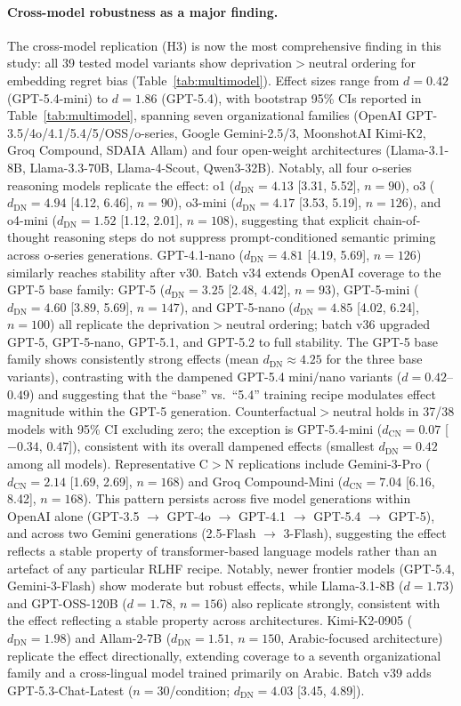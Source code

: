\documentclass[conference,10pt]{IEEEtran}
\begin{document}
\paragraph{Cross-model robustness as a major finding.}
The cross-model replication (H3) is now the most comprehensive finding in this study: all 39 tested model variants show deprivation$>$neutral ordering for embedding regret bias (Table~\ref{tab:multimodel}). Effect sizes range from $d=0.42$ (GPT-5.4-mini) to $d=1.86$ (GPT-5.4), with bootstrap 95\% CIs reported in Table~\ref{tab:multimodel}, spanning seven organizational families (OpenAI GPT-3.5/4o/4.1/5.4/5/OSS/o-series, Google Gemini-2.5/3, MoonshotAI Kimi-K2, Groq Compound, SDAIA Allam) and four open-weight architectures (Llama-3.1-8B, Llama-3.3-70B, Llama-4-Scout, Qwen3-32B). Notably, all four o-series reasoning models replicate the effect: o1 ($d_\text{DN}=4.13$ [3.31, 5.52], $n=90$), o3 ($d_\text{DN}=4.94$ [4.12, 6.46], $n=90$), o3-mini ($d_\text{DN}=4.17$ [3.53, 5.19], $n=126$), and o4-mini ($d_\text{DN}=1.52$ [1.12, 2.01], $n=108$), suggesting that explicit chain-of-thought reasoning steps do not suppress prompt-conditioned semantic priming across o-series generations. GPT-4.1-nano ($d_\text{DN}=4.81$ [4.19, 5.69], $n=126$) similarly reaches stability after v30. Batch v34 extends OpenAI coverage to the GPT-5 base family: GPT-5 ($d_\text{DN}=3.25$ [2.48, 4.42], $n=93$), GPT-5-mini ($d_\text{DN}=4.60$ [3.89, 5.69], $n=147$), and GPT-5-nano ($d_\text{DN}=4.85$ [4.02, 6.24], $n=100$) all replicate the deprivation$>$neutral ordering; batch v36 upgraded GPT-5, GPT-5-nano, GPT-5.1, and GPT-5.2 to full stability. The GPT-5 base family shows consistently strong effects (mean $d_\text{DN}\approx4.25$ for the three base variants), contrasting with the dampened GPT-5.4 mini/nano variants ($d=0.42$--$0.49$) and suggesting that the ``base'' vs.\ ``5.4'' training recipe modulates effect magnitude within the GPT-5 generation. Counterfactual$>$neutral holds in 37/38 models with 95\% CI excluding zero; the exception is GPT-5.4-mini ($d_\text{CN}=0.07$ [$-0.34$, $0.47$]), consistent with its overall dampened effects (smallest $d_\text{DN}=0.42$ among all models). Representative C$>$N replications include Gemini-3-Pro ($d_\text{CN}=2.14$ [1.69, 2.69], $n=168$) and Groq Compound-Mini ($d_\text{CN}=7.04$ [6.16, 8.42], $n=168$). This pattern persists across five model generations within OpenAI alone (GPT-3.5 $\to$ GPT-4o $\to$ GPT-4.1 $\to$ GPT-5.4 $\to$ GPT-5), and across two Gemini generations (2.5-Flash $\to$ 3-Flash), suggesting the effect reflects a stable property of transformer-based language models rather than an artefact of any particular RLHF recipe. Notably, newer frontier models (GPT-5.4, Gemini-3-Flash) show moderate but robust effects, while Llama-3.1-8B ($d=1.73$) and GPT-OSS-120B ($d=1.78$, $n=156$) also replicate strongly, consistent with the effect reflecting a stable property across architectures. Kimi-K2-0905 ($d_\text{DN}=1.98$) and Allam-2-7B ($d_\text{DN}=1.51$, $n=150$, Arabic-focused architecture) replicate the effect directionally, extending coverage to a seventh organizational family and a cross-lingual model trained primarily on Arabic. Batch v39 adds GPT-5.3-Chat-Latest ($n=30$/condition; $d_\text{DN}=4.03$ [3.45, 4.89]).
\end{document}
